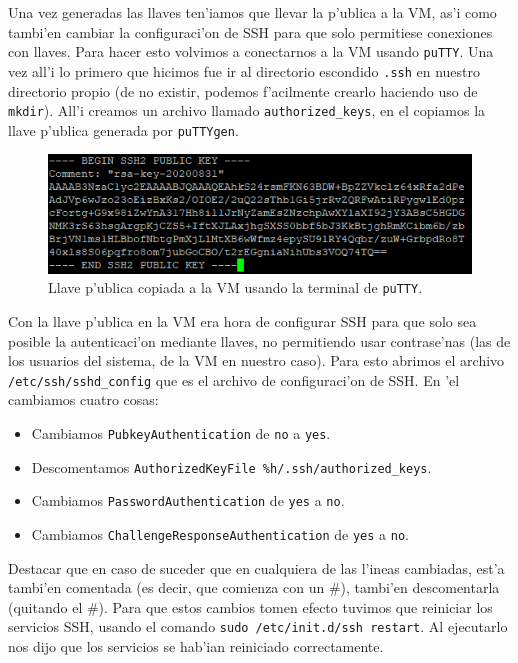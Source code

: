 \documentclass[11pt]{article}
\begin{document}
		Una vez generadas las llaves ten'iamos que llevar la p'ublica a la VM, as'i como tambi'en cambiar la configuraci'on de SSH para que solo permitiese conexiones con llaves. Para hacer esto volvimos a conectarnos a la VM usando \texttt{puTTY}. Una vez all'i lo primero que hicimos fue ir al directorio escondido \texttt{.ssh} en nuestro directorio propio (de no existir, podemos f'acilmente crearlo haciendo uso de \texttt{mkdir}). All'i creamos un archivo llamado \texttt{authorized\_keys}, en el copiamos la llave p'ublica generada por \texttt{puTTYgen}. 
		
		\begin{figure}[H]
    			\centering
    			\includegraphics[scale=0.9]{Images/Connection/public_key.PNG}
    			\caption{Llave p'ublica copiada a la VM usando la terminal de \texttt{puTTY}.}
    			\label{fig:public_key}
		\end{figure}
		
		Con la llave p'ublica en la VM era hora de configurar SSH para que solo sea posible la autenticaci'on mediante llaves, no permitiendo usar contrase'nas (las de los usuarios del sistema, de la VM en nuestro caso). Para esto abrimos el archivo \texttt{/etc/ssh/sshd\_config} que es el archivo de configuraci'on de SSH. En 'el cambiamos cuatro cosas:
		
		\begin{itemize}
			\item Cambiamos \texttt{PubkeyAuthentication} de \texttt{no} a \texttt{yes}.
			\item Descomentamos \texttt{AuthorizedKeyFile \qquad \%h/.ssh/authorized\_keys}.
			\item Cambiamos \texttt{PasswordAuthentication} de \texttt{yes} a  \texttt{no}.
			\item Cambiamos \texttt{ChallengeResponseAuthentication} de \texttt{yes} a \texttt{no}.
		\end{itemize}
		
		Destacar que en caso de suceder que en cualquiera de las l'ineas cambiadas, est'a tambi'en comentada (es decir, que comienza con un \#), tambi'en descomentarla (quitando el \#). Para que estos cambios tomen efecto tuvimos que reiniciar los servicios SSH, usando el comando \texttt{sudo /etc/init.d/ssh restart}. Al ejecutarlo nos dijo que los servicios se hab'ian reiniciado correctamente.
		
\end{document}
